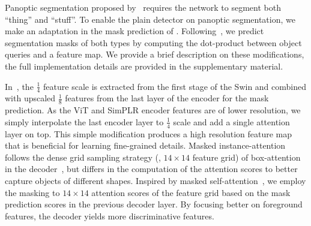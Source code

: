  Panoptic segmentation proposed by~\cite{kirillov2019panoptic} requires the network to segment both ``thing'' and ``stuff''.
To enable the plain detector on panoptic segmentation, we make an adaptation in the mask prediction of \ours. Following~\cite{cheng2022mask2former}, we predict segmentation masks of both types by computing the dot-product between object queries and a feature map. We provide a brief description on these modifications, the full implementation details are provided in the supplementary material.

In~\cite{cheng2022mask2former}, the $\frac{1}{4}$ feature scale is extracted from the first stage of the Swin and combined with upscaled $\frac{1}{8}$ features from the last layer of the encoder for the mask prediction. As the ViT and SimPLR encoder features are of lower resolution, we simply interpolate the last encoder layer to $\frac{1}{4}$ scale and add a single attention layer on top. This simple modification produces a high resolution feature map that is beneficial for learning fine-grained details.
%
Masked instance-attention follows the dense grid sampling strategy (\ie, $14\times14$ feature grid) of box-attention in the decoder~\cite{nguyen2022boxer}, but differs in the computation of the attention scores to better capture objects of different shapes. Inspired by masked self-attention~\cite{cheng2022mask2former}, we employ the masking to $14\times14$ attention scores of the feature grid based on the mask prediction scores in the previous decoder layer. By focusing better on foreground features, the decoder yields more discriminative features.


